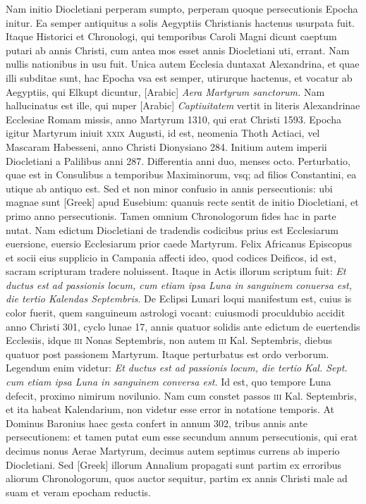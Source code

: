 Nam initio Diocletiani perperam sumpto, perperam quoque
persecutionis Epocha initur.
Ea semper antiquitus a solis Aegyptiis
Christianis hactenus usurpata fuit.
Itaque Historici et Chronologi,
qui temporibus Caroli Magni dicunt caeptum putari ab annis
Christi, cum antea mos esset annis Diocletiani uti, errant.
Nam
nullis nationibus in usu fuit.
Unica autem Ecclesia duntaxat Alexandrina,
et quae illi subditae sunt, hac Epocha vsa est semper, utirurque
hactenus, et vocatur ab Aegyptiis, qui Elkupt dicuntur,
\textarabic{[Arabic]} \textit{Aera Martyrum sanctorum.}
Nam
hallucinatus est ille, qui nuper \textarabic{[Arabic]}
\textit{Captiuitatem} vertit in literis
Alexandrinae Ecclesiae Romam missis, anno Martyrum 1310, qui
erat Christi 1593.
Epocha igitur Martyrum iniuit \textsc{xxix} Augusti,
id est, neomenia Thoth Actiaci, vel Mascaram Habesseni, anno Christi
Dionysiano 284.
Initium autem imperii Diocletiani a Palilibus
anni 287.
Differentia anni duo, menses octo.
Perturbatio, quae est in
Consulibus a temporibus Maximinorum, vsq; ad filios Constantini,
ea utique ab antiquo est.
Sed et non minor confusio in annis persecutionis:
ubi magnae sunt \textgreek{[Greek]} apud Eusebium: quanuis
recte sentit de initio Diocletiani, et primo anno persecutionis.
Tamen
omnium Chronologorum fides hac in parte nutat.
Nam edictum
Diocletiani de tradendis codicibus prius est Ecclesiarum euersione,
euersio Ecclesiarum prior caede Martyrum.
Felix Africanus Episcopus
et socii eius supplicio in Campania affecti ideo, quod codices
Deificos, id est, sacram scripturam tradere noluissent.
Itaque in
Actis illorum scriptum fuit: \textit{Et ductus est ad passionis locum, cum etiam
ipsa Luna in sanguinem conuersa est, die tertio Kalendas Septembris}.
De Eclipsi
Lunari loqui manifestum est, cuius is color fuerit, quem sanguineum
astrologi vocant: cuiusmodi proculdubio accidit anno Christi
301, cyclo lunae 17, annis quatuor solidis ante edictum de euertendis
Ecclesiis, idque \textsc{iii} Nonas Septembris, non autem \textsc{iii} Kal.
Septembris, diebus quatuor post passionem Martyrum.
Itaque perturbatus
est ordo verborum.
Legendum enim videtur: \textit{Et ductus est ad passionis
locum, die tertio Kal. Sept. cum etiam ipsa Luna in sanguinem conversa
est.}
Id est, quo tempore Luna defecit, proximo nimirum novilunio.
Nam cum constet passos \textsc{iii} Kal. Septembris, et ita habeat
Kalendarium, non videtur esse error in notatione temporis.
At Dominus Baronius haec gesta confert in annum 302, tribus annis ante
persecutionem: et tamen putat eum esse secundum annum persecutionis,
qui erat decimus nonus Aerae Martyrum, decimus autem
septimus currens ab imperio Diocletiani.
Sed \textgreek{[Greek]} illorum
Annalium propagati sunt partim ex erroribus aliorum Chronologorum,
quos auctor sequitur, partim ex annis Christi male ad
suam et veram epocham reductis.

